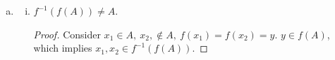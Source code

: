 \documentclass[12pt]{article}
\begin{document}
\begin{enumerate}[(a)]
\begin{enumerate}[(i)]
                  \item $f^{-1}(\bigcap_{i\in I} B_i) = \bigcap_{i\in I} f^{-1}(B_i)$
                        $B_i \subset T$
                        \begin{proof}
                              \begin{align*}
                                                           & x \in f^{-1}\Big(\bigcap_{i\in I} B_i\Big) \\
                                    \Longleftrightarrow \  & f(x) \in B_i \ \ \forall \,i \in I         \\
                                    \Longleftrightarrow \  & x \in f^{-1}(B_i) \ \ \forall \, i \in I   \\
                                    \Longleftrightarrow \  & x \in \bigcap_{i\in I} f^{-1}(B_i)
                              \end{align*}
                        \end{proof}
                  \item $f^{-1}(B^c) = f^{-1}(B)^c$
                        \begin{proof}
                              \begin{align*}
                                                           & x \in f^{-1}(B^c)  \\
                                    \Longleftrightarrow \  & f(x) \in B^c       \\
                                    \Longleftrightarrow \  & f(x) \notin B      \\
                                    \Longleftrightarrow \  & x \notin f^{-1}(B) \\
                                    \Longleftrightarrow \  & x \in f^{-1}(B)^c
                              \end{align*}
                        \end{proof}
            \end{enumerate}
      \item
            \begin{enumerate}[(i)]
                  \item  $f^{-1}(f(A)) \ne A$.  \begin{proof}
                              Consider $x_1 \in A, \  x_2, \notin A,\  f(x_1) = f(x_2) = y$.
                              $y \in f(A)$, which implies $x_1, x_2 \in f^{-1}(f(A))$.
                        \end{proof}


\end{enumerate}
\end{enumerate}
\end{document}
